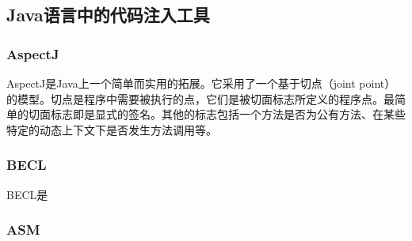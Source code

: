 \subsection{Java语言中的代码注入工具}
\subsubsection{AspectJ}

AspectJ\cite{aspectJ}是Java上一个简单而实用的拓展。它采用了一个基于切点（joint point）的模型。切点是程序中需要被执行的点，它们是被切面标志所定义的程序点。最简单的切面标志即是显式的签名。其他的标志包括一个方法是否为公有方法、在某些特定的动态上下文下是否发生方法调用等。

\subsubsection{BECL}

BECL\cite{becl}是

\subsubsection{ASM}
